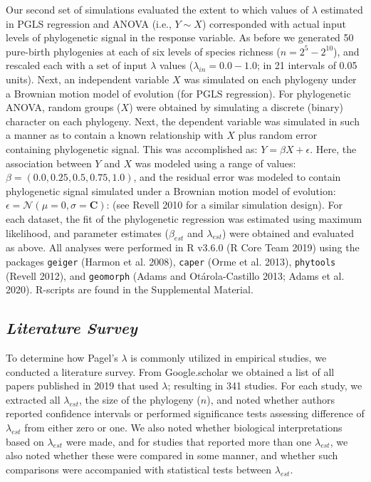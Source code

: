 \documentclass[
]{article}
\begin{document}
Our second set of simulations evaluated the extent to which values of
\(\lambda\) estimated in PGLS regression and ANOVA (i.e., \(Y\sim{X}\))
corresponded with actual input levels of phylogenetic signal in the
response variable. As before we generated 50 pure-birth phylogenies at
each of six levels of species richness (\(n=2^5 - 2^{10}\)), and
rescaled each with a set of input \(\lambda\) values
(\(\lambda_{in} = 0.0 - 1.0\); in 21 intervals of 0.05 units). Next, an
independent variable \(X\) was simulated on each phylogeny under a
Brownian motion model of evolution (for PGLS regression). For
phylogenetic ANOVA, random groups (\(X\)) were obtained by simulating a
discrete (binary) character on each phylogeny. Next, the dependent
variable was simulated in such a manner as to contain a known
relationship with \(X\) plus random error containing phylogenetic
signal. This was accomplished as: \(Y=\beta{X}+\epsilon\). Here, the
association between \(Y\) and \(X\) was modeled using a range of values:
\(\beta=(0.0,0.25, 0.5, 0.75,1.0)\), and the residual error was modeled
to contain phylogenetic signal simulated under a Brownian motion model
of evolution: \(\epsilon=\mathcal{N}(\mu=0,\sigma=\mathbf{C})\): (see
Revell 2010 for a similar simulation design). For each dataset, the fit
of the phylogenetic regression was estimated using maximum likelihood,
and parameter estimates (\(\beta_{est}\) and \(\lambda_{est}\)) were
obtained and evaluated as above. All analyses were performed in R v3.6.0
(R Core Team 2019) using the packages \texttt{geiger} (Harmon et al.
2008), \texttt{caper} (Orme et al. 2013), \texttt{phytools} (Revell
2012), and \texttt{geomorph} (Adams and Otárola-Castillo 2013; Adams et
al. 2020). R-scripts are found in the Supplemental Material.

\hypertarget{literature-survey}{%
\subsection{\texorpdfstring{\emph{Literature
Survey}}{Literature Survey}}\label{literature-survey}}

To determine how Pagel's \(\lambda\) is commonly utilized in empirical
studies, we conducted a literature survey. From Google.scholar we
obtained a list of all papers published in 2019 that used \(\lambda\);
resulting in 341 studies. For each study, we extracted all
\(\lambda_{est}\), the size of the phylogeny (\(n\)), and noted whether
authors reported confidence intervals or performed significance tests
assessing difference of \(\lambda_{est}\) from either zero or one. We
also noted whether biological interpretations based on \(\lambda_{est}\)
were made, and for studies that reported more than one
\(\lambda_{est}\), we also noted whether these were compared in some
manner, and whether such comparisons were accompanied with statistical
tests between \(\lambda_{est}\). \hfill\break
\end{document}
